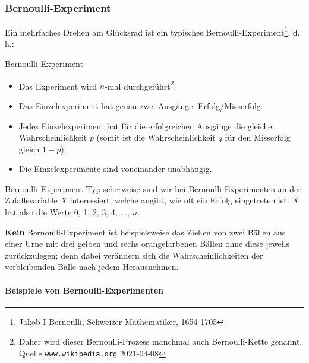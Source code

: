 

\subsubsection{Bernoulli-Experiment}
Ein mehrfaches Drehen am Glücksrad ist ein typisches
Bernoulli-Experiment\footnote{Jakob I Bernoulli, Schweizer Mathematiker,
  1654-1705}, d.\,h.:

\begin{definition}{Bernoulli-Experiment}{}
\begin{itemize}
\item Das Experiment wird $n$-mal durchgeführt\footnote{Daher wird dieser
Bernoulli-Prozess manchmal auch Bernoulli-Kette genannt. Quelle
\texttt{www.wikipedia.org} 2021-04-08}.
\item Das Einzelexperiment hat genau zwei Ausgänge: Erfolg/Misserfolg.
\item Jedes Einzelexperiment hat für die erfolgreichen Ausgänge die gleiche
      Wahrscheinlichkeit $p$ (somit ist die Wahrscheinlichkeit $q$ für den
      Misserfolg gleich $1-p$).
\item Die Einzelexperimente sind voneinander unabhängig.
\end{itemize}
\end{definition}

\begin{bemerkung}{Bernoulli-Experiment}{}
Typischerweise sind wir bei Bernoulli-Experimenten an der
Zufallsvariable $X$ interessiert, welche angibt, wie oft ein Erfolg
eingetreten ist: $X$ hat also die Werte 0, 1, 2, 3, 4, ..., $n$.
\end{bemerkung}

\textbf{Kein} Bernoulli-Experiment ist beispielsweise das Ziehen von zwei Bällen aus
einer Urne mit drei gelben und sechs orangefarbenen Bällen ohne diese
jeweils zurückzulegen; denn dabei verändern sich die
Wahrscheinlichkeiten der verbleibenden Bälle nach jedem Herausnehmen.
\newpage


\paragraph{Beispiele von Bernoulli-Experimenten}

